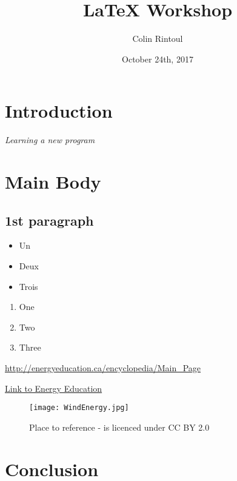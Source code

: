 \documentclass[12]{article}
\title{LaTeX Workshop}
\author{Colin Rintoul }
\date{October 24th, 2017}
\begin{document}
\maketitle

\section{Introduction}

\textit{Learning a new program} 

\section{Main Body}

\subsection{1st paragraph}

\begin{itemize}
    \item Un 
    \item Deux 
    \item Trois 
\end{itemize}


\begin{enumerate}
    \item One 
    \item Two 
    \item Three 
\end{enumerate}

\url{http://energyeducation.ca/encyclopedia/Main_Page}

\href{http://energyeducation.ca/encyclopedia/Main_Page}{Link to Energy Education}
\begin{figure}
    \centering
    \texttt{[image: WindEnergy.jpg]}
    \caption{Place to reference - is licenced under CC BY 2.0}
    \label{fig:my_label}
\end{figure}


\section{Conclusion}
\end{document}
